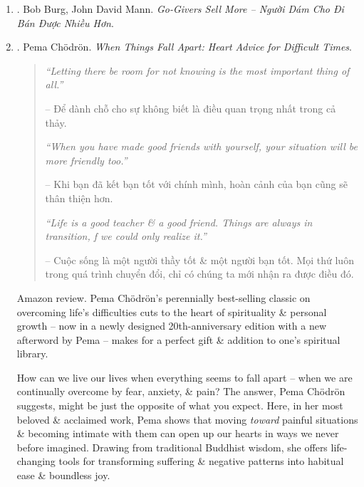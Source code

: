 \documentclass{article}
\begin{document}
\begin{enumerate}
	\item \cite{Burg_Mann_giver_VN}. {\sc Bob Burg, John David Mann}. {\it Go-Givers Sell More -- Người Dám Cho Đi Bán Được Nhiều Hơn}.\hfill{\sf[done]}
	
	\item \cite{Chodron_fall_apart}. {\sc Pema Ch\"odr\"on}. {\it When Things Fall Apart: Heart Advice for Difficult Times}.\hfill{\sf[reading]}
	\begin{quotation}
		{\it``Letting there be room for not knowing is the most important thing of all.''}
		
		-- Để dành chỗ cho sự không biết là điều quan trọng nhất trong cả thảy.
		
		{\it``When you have made good friends with yourself, your situation will be more friendly too.''}
		
		-- Khi bạn đã kết bạn tốt với chính mình, hoàn cảnh của bạn cũng sẽ thân thiện hơn.
		
		{\it``Life is a good teacher \& a good friend. Things are always in transition, f we could only realize it.''}
		
		-- Cuộc sống là một người thầy tốt \& một người bạn tốt. Mọi thứ luôn trong quá trình chuyển đổi, chỉ có chúng ta mới nhận ra được điều đó.
	\end{quotation}
	{\sf Amazon review.} {\sc Pema Ch\"odr\"on}'s perennially best-selling classic on overcoming life's difficulties cuts to the heart of spirituality \& personal growth -- now in a newly designed 20th-anniversary edition with a new afterword by {\sc Pema} -- makes for a perfect gift \& addition to one's spiritual library.
	
	How can we live our lives when everything seems to fall apart -- when we are continually overcome by fear, anxiety, \& pain? The answer, {\sc Pema Ch\"odr\"on} suggests, might be just the opposite of what you expect. Here, in her most beloved \& acclaimed work, {\sc Pema} shows that moving {\it toward} painful situations \& becoming intimate with them can open up our hearts in ways we never before imagined. Drawing from traditional Buddhist wisdom, she offers life-changing tools for transforming suffering \& negative patterns into habitual ease \& boundless joy.
	

\end{enumerate}
\end{document}
